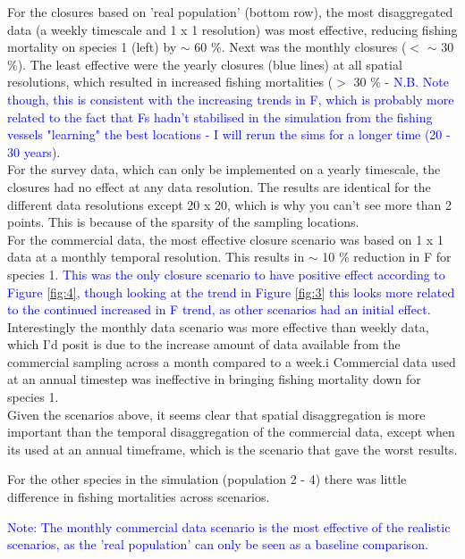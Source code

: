 \documentclass[review]{elsarticle}
\begin{document}
For the closures based on 'real population' (bottom row), the most
disaggregated data (a weekly timescale and 1 x 1 resolution) was most
effective, reducing fishing mortality on species 1 (left) by $\sim$ 60 \%. Next
was the monthly closures ($<$ $\sim$ 30 \%).  The least effective were the
yearly closures (blue lines) at all spatial resolutions, which resulted in
increased fishing mortalities ($>$ 30 \% - \textcolor{blue}{N.B. Note though,
this is consistent with the increasing trends in F, which is probably more
related to the fact that Fs hadn't stabilised in the simulation from the
fishing vessels "learning" the best locations - I will rerun the sims for a
longer time (20 - 30 years)}. \\

For the survey data, which can only be implemented on a yearly timescale, the
closures had no effect at any data resolution. The results are identical for
the different data resolutions except 20 x 20, which is why you can't see more
than 2 points. This is because of the sparsity of the sampling locations.\\

For the commercial data, the most effective closure scenario was based on 1 x 1
data at a monthly temporal resolution. This results in $\sim$ 10 \% reduction
in F for species 1. \textcolor{blue}{This was the only closure scenario to have
	positive effect according to Figure \ref{fig:4}, though looking at the
	trend in Figure \ref{fig:3} this looks more related to the continued
	increased in F trend, as other scenarios had an initial effect}.
Interestingly the monthly data scenario was more effective than weekly data,
which I'd posit is due to the increase amount of data available from the
commercial sampling across a month compared to a week.i Commercial data used at
an annual timestep was ineffective in bringing fishing mortality down for
species 1. \\

Given the scenarios above, it seems clear that spatial disaggregation is more
important than the temporal disaggregation of the commercial data, except when
its used at an annual timeframe, which is the scenario that gave the worst
results.

For the other species in the simulation (population 2 - 4) there was little
difference in fishing mortalities across scenarios.

\textcolor{blue}{Note: The monthly commercial data scenario is the most
	effective of the realistic scenarios, as the 'real population' can only
	be seen as a baseline comparison.}
\end{document}
